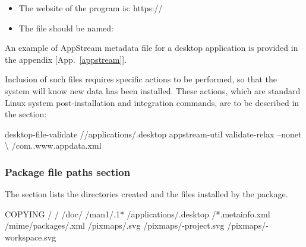 \begin{itemize}
\vspace{-0.125cm}
\begin{center}\end{center}
\vspace{-0.25cm}
\begin{itemize}
\item The website of the program is: \quad https://
\item The file should be named: \quad\qquad {}
\end{itemize}
An example of AppStream metadata file for a desktop application is provided in the appendix [App.~\ref{appstream}].
\end{itemize}
Inclusion of such files requires specific actions to be performed, so that the system will know new data has been installed.
These actions, which are standard Linux system post-installation and integration commands, are to be described in the  section:
{\footnotesize{
\begin{script}
desktop-file-validate //applications/.desktop
appstream-util validate-relax --nonet \textbackslash
\tabul {}/com..www.appdata.xml
\end{script}
}}

\clearpage
\subsubsection{Package file paths section}
\label{rpmfiles}

The  section lists the directories created and the files installed by the package.
{\footnotesize{
\begin{script}
 COPYING
/
/
/doc/
/man1/.1*
/applications/.desktop
/*.metainfo.xml
/mime/packages/.xml
/pixmaps/.svg
/pixmaps/-project.svg
/pixmaps/-workspace.svg
\end{script}
}}

